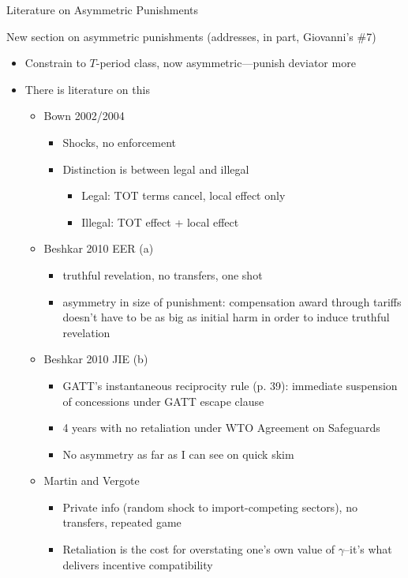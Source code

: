 \documentclass[12pt]{article}
\newcommand{\ga}{\gamma}
\begin{document}
\begin{center}
Literature on Asymmetric Punishments
\end{center}


New section on asymmetric punishments (addresses, in part, Giovanni's $\#$7)
\begin{itemize}
	\item Constrain to $T$-period class, now asymmetric---punish deviator more
	\item There is literature on this
		\begin{itemize}
			\item Bown 2002/2004
				\begin{itemize}
					\item Shocks, no enforcement
					\item Distinction is between legal and illegal
						\begin{itemize}
							\item Legal: TOT terms cancel, local effect only
							\item Illegal: TOT effect + local effect
						\end{itemize}
				\end{itemize}
			\item Beshkar 2010 EER (a)
				\begin{itemize}
					\item truthful revelation, no transfers, one shot
					\item asymmetry in size of punishment: compensation award through tariffs doesn't have to be as big as initial harm in order to induce truthful revelation
				\end{itemize}
			\item Beshkar 2010 JIE (b)
				\begin{itemize}
					\item GATT's instantaneous reciprocity rule (p. 39): immediate suspension of concessions under GATT escape clause
					\item 4 years with no retaliation under WTO Agreement on Safeguards
					\item No asymmetry as far as I can see on quick skim
				\end{itemize}
			\item Martin and Vergote
				\begin{itemize}
					\item Private info (random shock to import-competing sectors), no transfers, repeated game
					\item Retaliation is the cost for overstating one's own value of $\ga$--it's what delivers incentive compatibility

\end{itemize}
\end{itemize}
\end{itemize}
\end{document}
